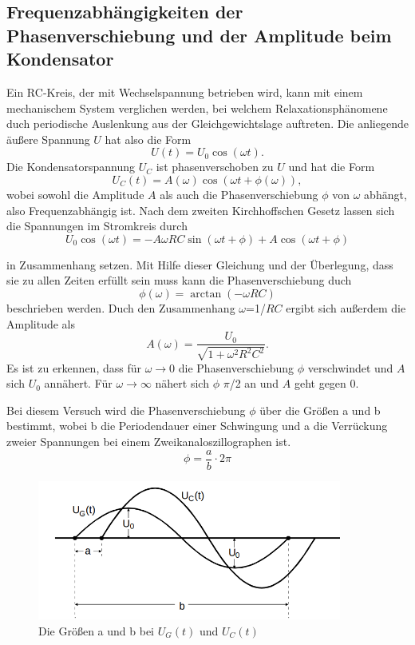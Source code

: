 \subsection{Frequenzabhängigkeiten der Phasenverschiebung und der Amplitude beim Kondensator}
Ein RC-Kreis, der mit Wechselspannung betrieben wird,
kann mit einem mechanischem System verglichen werden,
bei welchem Relaxationsphänomene duch periodische
Auslenkung aus der Gleichgewichtslage auftreten.
Die anliegende äußere Spannung $U$ hat also die Form
\begin{equation}
    U(t)=U_0 \cos (\omega t).
\end{equation}
\noindent Die Kondensatorspannung $U_C$ ist
phasenverschoben zu $U$ und hat die Form
\begin{equation}
    U_C(t)=A(\omega) \cos (\omega t + \phi(\omega)),
\end{equation}
\noindent wobei sowohl die Amplitude $A$ als auch
die Phasenverschiebung $\phi$ von $\omega$
abhängt, also Frequenzabhängig ist. Nach dem zweiten
Kirchhoffschen Gesetz lassen sich die Spannungen
im Stromkreis durch
\begin{equation}
    U_0 \cos (\omega t)=-A\omega RC \sin (\omega t + \phi)+A \cos (\omega t+\phi)
    \label{eq:a}
\end{equation}

\noindent in Zusammenhang setzen. Mit Hilfe dieser
Gleichung und der Überlegung, dass sie zu allen Zeiten 
erfüllt sein muss kann die Phasenverschiebung duch
\begin{equation}
    \phi (\omega)= \arctan (-\omega RC)
\end{equation}
\noindent beschrieben werden. Duch den Zusammenhang
$\omega$=1/$RC$ ergibt sich außerdem die Amplitude als
\begin{equation}
    A(\omega)=\frac{U_0}{\sqrt{1+\omega^2 R^2 C^2}}.
\end{equation}
\noindent Es ist zu erkennen, dass für
$\omega \to 0$ die Phasenverschiebung $\phi$ verschwindet
und $A$ sich $U_0$ annähert. Für $\omega \to \infty$
nähert sich $\phi$ $\pi$/2 an und $A$ geht gegen 0.

Bei diesem Versuch wird die Phasenverschiebung $\phi$
über die Größen a und b bestimmt, wobei b die Periodendauer
einer Schwingung und a die Verrückung zweier Spannungen
bei einem Zweikanaloszillographen ist.
\begin{equation}
    \phi=\frac{a}{b}\cdot2\pi
\end{equation}
\begin{figure}
    \centering
    \includegraphics[width=10cm]{content/ab.png}
    \caption{Die Größen a und b bei $U_G(t)$ und $U_C(t)$ \cite{sample}}
\end{figure}


